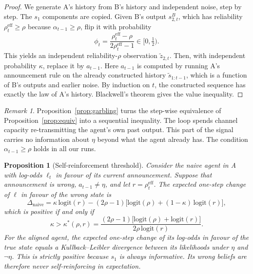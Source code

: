 \documentclass[11pt]{article}
\newtheorem{proposition}{Proposition}
\theoremstyle{definition}
\theoremstyle{remark}
\newtheorem*{remark}{Remark}
\newcommand{\reff}{\rho^{\mathrm{eff}}}
\begin{document}
\begin{proof}
We generate A's history from B's history and independent noise, step by step.
The $s_1$ components are copied. Given B's output $s^B_{2,t}$, which has
reliability $\reff_t\ge\rho$ because $\alpha_{t-1}\ge\rho$, flip it with
probability
\begin{equation}
\phi_t=\frac{\reff_t-\rho}{2\reff_t-1}\in[0,\tfrac12).
\end{equation}
This yields an independent reliability-$\rho$ observation $\tilde z_{2,t}$. Then,
with independent probability $\kappa$, replace it by $a_{t-1}$. Here $a_{t-1}$
is computed by running A's announcement rule on the already constructed history
$\tilde s_{1:t-1}$, which is a function of B's outputs and earlier noise. By
induction on $t$, the constructed sequence has exactly the law of A's history.
Blackwell's theorem \citep{blackwell1953} gives the value inequality.
\end{proof}

\begin{remark}
Proposition~\ref{prop:garbling} turns the step-wise equivalence of
Proposition~\ref{prop:equiv} into a sequential inequality. The loop spends
channel capacity re-transmitting the agent's own past output. This part of the
signal carries no information about $\eta$ beyond what the agent already has.
The condition $\alpha_{t-1}\ge\rho$ holds in all our runs.
\end{remark}

\begin{proposition}[Self-reinforcement threshold]\label{prop:drift}
Consider the naive agent in A with log-odds $\ell_t$ in favour of its current
announcement. Suppose that announcement is wrong, $a_{t-1}\neq\eta$, and let
$r=\reff_t$. The expected one-step change of $\ell$ in favour of the wrong state
is
\begin{equation}
\Delta_{\text{naive}}=\kappa\,\mathrm{logit}(r)-(2\rho-1)\big[\mathrm{logit}(\rho)
+(1-\kappa)\,\mathrm{logit}(r)\big],
\label{eq:drift}
\end{equation}
which is positive if and only if
\begin{equation}
\kappa>\kappa^\ast(\rho,r)=\frac{(2\rho-1)\big[\mathrm{logit}(\rho)+\mathrm{logit}(r)\big]}
{2\rho\,\mathrm{logit}(r)}.
\label{eq:kstar}
\end{equation}
For the aligned agent, the expected one-step change of its log-odds in favour of
the true state equals a Kullback--Leibler divergence between its likelihoods
under $\eta$ and $\neg\eta$. This is strictly positive because $s_1$ is always
informative. Its wrong beliefs are therefore never self-reinforcing in
expectation.
\end{proposition}
\end{document}
